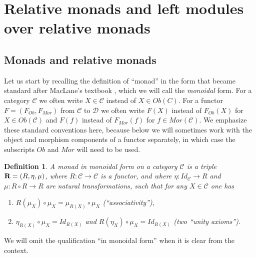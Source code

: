 \documentclass[12pt]{amsart}
\newtheorem{definition}[proposition]{Definition}
\newcommand{\llabel}[1]{\label{#1}}
\newcommand{\sr}{\rightarrow}
\newcommand{\wh}{\widehat}
\newcommand{\R}{{\bf R}}
\newcommand{\C}{{\mathcal C}}
\newcommand{\D}{{\mathcal D}}
\begin{document}

\section{Relative monads and left modules over relative monads}

\subsection{Monads and relative monads} 

Let us start by recalling the definition of ``monad'' in the form that became
standard after MacLane's textbook \cite[p.~133]{MacLane}, which we will call
the {\em monoidal} form. For a category $\C$ we often write $X\in\C$ instead of
$X\in Ob(C)$. For a functor $F=(F_{Ob},F_{Mor})$ from $\C$ to $\D$ we often
write $F(X)$ instead of $F_{Ob}(X)$ for $X\in Ob(\C)$ and $F(f)$ instead of
$F_{Mor}(f)$ for $f\in Mor(\C)$.  We emphasize these standard conventions here,
because below we will sometimes work with the object and morphism components of
a functor separately, in which case the subscripts $Ob$ and $Mor$ will need to
be used.
%
\begin{definition}
  \llabel{2017.04.01.def1}
  A monad in monoidal form on a category $\C$ is a triple $\R=(R,\eta,\mu)$,
  where $R:\C\sr \C$ is a functor, and where $\eta:Id_{\C}\sr R$ and $\mu:R\circ R\sr R$
  are natural transformations, such that for any $X\in\C$ one has
  \begin{enumerate}
  \item \llabel{2017.04.19.eq7} $R(\mu_X)\circ \mu_{X}=\mu_{R(X)}\circ \mu_X$ (``associativity''),
  \item \llabel{2017.04.19.eq8} $\eta_{R(X)}\circ \mu_X=Id_{R(X)}$ and $R(\eta_X)\circ \mu_X=Id_{R(X)}$ (two ``unity axioms'').
  \end{enumerate}
\end{definition}
%
We will omit the qualification ``in monoidal form'' when it is clear from the context. 
\end{document}
